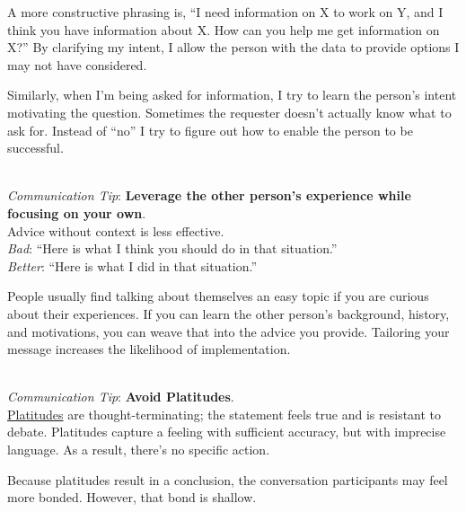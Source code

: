 A more constructive phrasing is, ``I need information on X to work on Y, and I think you have information about X. How can you help me get information on X?'' By clarifying my intent, I allow the person with the data to provide options I may not have considered.

Similarly, when I'm being asked for information, I try to learn the person's intent motivating the question. Sometimes the requester doesn't actually know what to ask for. Instead of ``no'' I try to figure out how to enable the person to be successful. 

\ \\
\textit{Communication Tip}: \textbf{Leverage the other person's experience while focusing on your own\label{sec:advice}}.\\
Advice without context is less effective.\\
\textit{Bad}: ``Here is what I think you should do in that situation.''\\
\textit{Better}: ``Here is what I did in that situation.''

People usually find talking about themselves an easy topic if you are curious about their experiences. 
If you can learn the other person's background, history, and motivations, you can weave that into the advice you provide. 
Tailoring your message increases the likelihood of implementation. 

\ \\
\textit{Communication Tip}: 
\textbf{Avoid Platitudes\label{sec:platitudes}}.\\
\href{https://en.wikipedia.org/wiki/Platitude}{Platitudes}
are \gls{thought-terminating}; 
\iftoggle{glossaryinmargin}{\marginpar{[Glossary]}}{} the statement feels true and is resistant to debate. Platitudes capture a feeling with sufficient accuracy, but with imprecise language. As a result, there's no specific action.

Because platitudes result in a conclusion, the conversation participants may feel more bonded. However, that bond is shallow.

